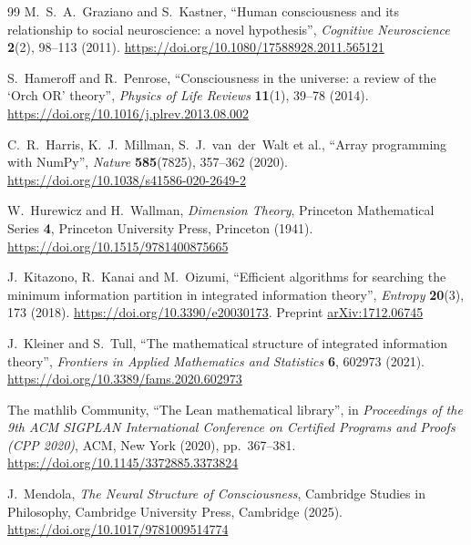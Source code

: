 \begin{thebibliography}{99}
M.~S.~A.~Graziano and S.~Kastner, ``Human consciousness and its relationship to social neuroscience: a novel hypothesis'', \emph{Cognitive Neuroscience} \textbf{2}(2), 98--113 (2011).
\href{https://doi.org/10.1080/17588928.2011.565121}{https://doi.org/10.1080/17588928.2011.565121}

S.~Hameroff and R.~Penrose, ``Consciousness in the universe: a review of the `Orch OR' theory'', \emph{Physics of Life Reviews} \textbf{11}(1), 39--78 (2014).
\href{https://doi.org/10.1016/j.plrev.2013.08.002}{https://doi.org/10.1016/j.plrev.2013.08.002}

C.~R.~Harris, K.~J.~Millman, S.~J.~van~der~Walt et al., ``Array programming with NumPy'', \emph{Nature} \textbf{585}(7825), 357--362 (2020).
\href{https://doi.org/10.1038/s41586-020-2649-2}{https://doi.org/10.1038/s41586-020-2649-2}

W.~Hurewicz and H.~Wallman, \emph{Dimension Theory}, Princeton Mathematical Series \textbf{4}, Princeton University Press, Princeton (1941).
\href{https://doi.org/10.1515/9781400875665}{https://doi.org/10.1515/9781400875665}

J.~Kitazono, R.~Kanai and M.~Oizumi, ``Efficient algorithms for searching the minimum information partition in integrated information theory'', \emph{Entropy} \textbf{20}(3), 173 (2018).
\href{https://doi.org/10.3390/e20030173}{https://doi.org/10.3390/e20030173}. Preprint \href{https://arxiv.org/abs/1712.06745}{arXiv:1712.06745}

J.~Kleiner and S.~Tull, ``The mathematical structure of integrated information theory'', \emph{Frontiers in Applied Mathematics and Statistics} \textbf{6}, 602973 (2021).
\href{https://doi.org/10.3389/fams.2020.602973}{https://doi.org/10.3389/fams.2020.602973}

The mathlib Community, ``The Lean mathematical library'', in \emph{Proceedings of the 9th ACM SIGPLAN International Conference on Certified Programs and Proofs (CPP 2020)}, ACM, New York (2020), pp.~367--381.
\href{https://doi.org/10.1145/3372885.3373824}{https://doi.org/10.1145/3372885.3373824}

J.~Mendola, \emph{The Neural Structure of Consciousness}, Cambridge Studies in Philosophy, Cambridge University Press, Cambridge (2025).
\href{https://doi.org/10.1017/9781009514774}{https://doi.org/10.1017/9781009514774}


\end{thebibliography}
